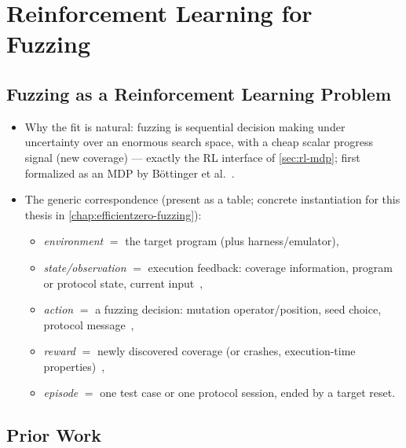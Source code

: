 
\section{Reinforcement Learning for Fuzzing}\label{sec:reinforcement-fuzzing}


\subsection{Fuzzing as a Reinforcement Learning Problem}\label{sec:rlfuzz-framing}

\begin{itemize}
  \item Why the fit is natural: fuzzing is sequential decision making under uncertainty over an
    enormous search space, with a cheap scalar progress signal (new coverage) --- exactly the RL
    interface of \cref{sec:rl-mdp}; first formalized as an MDP by Böttinger et
    al.~\cite{bottinger_deep_2018}.
  \item The generic correspondence (present as a table; concrete instantiation for this thesis in
    \cref{chap:efficientzero-fuzzing}):
    \begin{itemize}
      \item \emph{environment} $=$ the target program (plus harness/emulator),
      \item \emph{state/observation} $=$ execution feedback: coverage information, program or
        protocol state, current input~\cite{bottinger_deep_2018,borcherding_bandits_2023},
      \item \emph{action} $=$ a fuzzing decision: mutation operator/position, seed choice,
        protocol message~\cite{bottinger_deep_2018,binosi_rainfuzz_2023,borcherding_bandits_2023},
      \item \emph{reward} $=$ newly discovered coverage (or crashes, execution-time
        properties)~\cite{bottinger_deep_2018,wang_syzvegas_2021},
      \item \emph{episode} $=$ one test case or one protocol session, ended by a target reset.
    \end{itemize}
\end{itemize}

\subsection{Prior Work}\label{sec:rlfuzz-prior-work}

